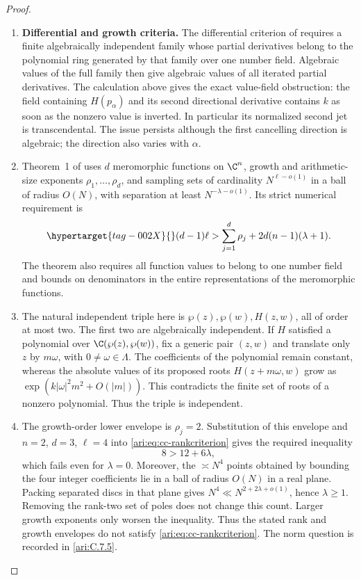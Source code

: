 \begin{proof}
\begin{enumerate}[label=\arabic*.,leftmargin=*]
\item \textbf{Differential and growth criteria.}
The differential criterion of
\citet[Theorems~3.6--3.7, author proof, pp.~21--22]{waldschmidt2009auxiliary}
requires a finite algebraically independent family whose
partial derivatives belong to the polynomial ring generated
by that family over one number field. Algebraic values of
the full family then give algebraic values of all iterated
partial derivatives. The calculation above gives the exact value-field obstruction:
the field containing $H(p_\alpha)$ and its second directional
derivative contains $k$ as soon as the nonzero value is inverted.
In particular its normalized second jet is transcendental. The issue persists
although the first cancelling direction is algebraic; the
direction also varies with $\alpha$.

\item Theorem~1 of
\cite[p.~24]{waldschmidt1975dimension} uses $d$ meromorphic functions on $\C^n$, growth and
arithmetic-size exponents $\rho_1,\ldots,\rho_d$, and sampling
sets of cardinality $N^{\ell-o(1)}$ in a ball of radius $O(N)$,
with separation at least $N^{-\lambda-o(1)}$. Its strict numerical
requirement is
\begin{equation}\hypertarget{tag-002X}{}\label{ari:eq:cc-rankcriterion}
 (d-1)\ell>\sum_{j=1}^d\rho_j
                     +2d(n-1)(\lambda+1).
\end{equation}
The theorem also requires all function values to belong to
one number field and bounds on denominators in the entire
representations of the meromorphic functions. 

\item The natural independent triple here is
$\wp(z),\wp(w),H(z,w)$, all of order at most two.
The first two are algebraically independent. If $H$ satisfied
a polynomial over $\C(\wp(z),\wp(w))$, fix a generic pair
$(z,w)$ and translate only $z$ by $m\omega$, with
$0\ne\omega\in\Lambda$. The coefficients of the polynomial
remain constant, whereas the absolute values of its proposed
roots $H(z+m\omega,w)$ grow as
$\exp(k|\omega|^2m^2+O(|m|))$. This contradicts the finite
set of roots of a nonzero polynomial. Thus the triple is
independent.

\item The growth-order lower envelope is $\rho_j=2$. Substitution of
this envelope and $n=2$, $d=3$, $\ell=4$ into
\eqref{ari:eq:cc-rankcriterion} gives the required inequality
\[
 8>12+6\lambda,
\]
which fails even for $\lambda=0$. Moreover, the $\asymp N^4$
points obtained by bounding
the four integer coefficients lie in a ball of radius $O(N)$
in a real plane. Packing separated discs in that plane gives
$N^4\ll N^{2+2\lambda+o(1)}$, hence $\lambda\ge1$.
Removing the rank-two set of poles does not change this count.
Larger growth exponents only worsen the inequality. Thus the stated rank and growth envelopes do not satisfy
\eqref{ari:eq:cc-rankcriterion}. The norm question is
recorded in \cref{ari:C.7.5}.
\end{enumerate}
\end{proof}